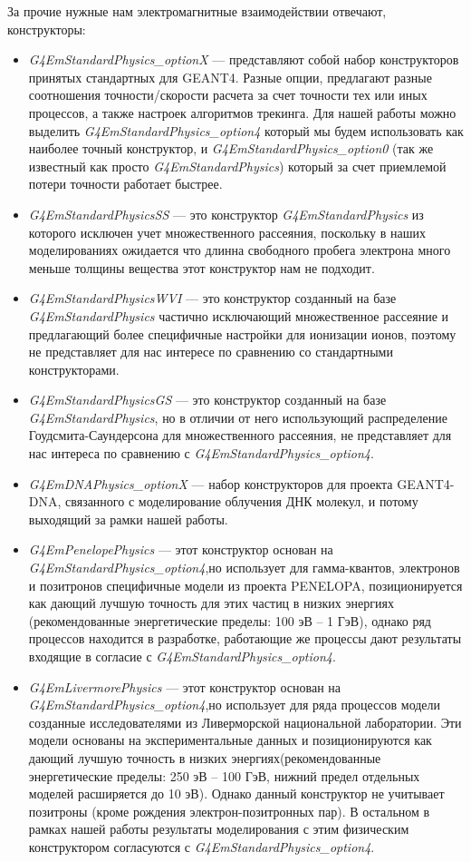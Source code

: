За прочие нужные нам электромагнитные взаимодействии отвечают, конструкторы:
\begin{itemize}
    \item \textit{G4EmStandardPhysics\_optionX} --- представляют собой набор конструкторов принятых стандартных для GEANT4. Разные опции, предлагают разные соотношения точности/скорости расчета за счет точности тех или иных процессов, а также настроек алгоритмов трекинга. Для нашей работы можно выделить  \textit{G4EmStandardPhysics\_option4} который мы будем использовать как наиболее точный конструктор, и \textit{G4EmStandardPhysics\_option0} (так же известный как просто \textit{G4EmStandardPhysics}) который за счет приемлемой потери точности работает быстрее.
    \item \textit{G4EmStandardPhysicsSS} --- это конструктор \textit{G4EmStandardPhysics} из которого исключен учет множественного рассеяния, поскольку в наших моделированиях ожидается что длинна свободного пробега электрона много меньше толщины вещества этот конструктор нам не подходит.
    \item \textit{G4EmStandardPhysicsWVI} --- это конструктор созданный на базе \textit{G4EmStandardPhysics} частично исключающий множественное рассеяние и предлагающий более специфичные настройки для ионизации ионов, поэтому не представляет для нас интересе по сравнению со стандартными конструкторами.
    \item \textit{G4EmStandardPhysicsGS} --- это конструктор созданный на базе \textit{G4EmStandardPhysics}, но в отличии от него использующий распределение Гоудсмита-Саундерсона для множественного рассеяния,  не представляет для нас интереса по сравнению с \textit{G4EmStandardPhysics\_option4}.
    \item \textit{G4EmDNAPhysics\_optionX} --- набор конструкторов для проекта GEANT4-DNA, связанного с моделирование облучения ДНК молекул, и потому выходящий за рамки нашей работы. 
    \item \textit{G4EmPenelopePhysics} --- этот конструктор основан на \textit{G4EmStandardPhysics\_option4},но использует для гамма-квантов, электронов и позитронов специфичные модели из проекта PENELOPA, позиционируется как дающий лучшую точность для этих частиц в низких энергиях (рекомендованные энергетические пределы: 100 эВ -- 1 ГэВ), однако ряд процессов находится в разработке, работающие же процессы дают результаты входящие в согласие с \textit{G4EmStandardPhysics\_option4}.
    \item \textit{G4EmLivermorePhysics}  --- этот конструктор основан на \textit{G4EmStandardPhysics\_option4},но использует для ряда процессов модели созданные исследователями из Ливерморской национальной лаборатории. Эти модели основаны на экспериментальные данных и позиционируются как дающий лучшую точность в низких энергиях(рекомендованные энергетические пределы: 250 эВ -- 100 ГэВ, нижний предел отдельных моделей расширяется до 10 эВ). Однако данный конструктор не учитывает позитроны (кроме рождения электрон-позитронных пар). В остальном  в рамках нашей работы результаты моделирования с этим физическим конструктором согласуются с \textit{G4EmStandardPhysics\_option4}.

\end{itemize}
